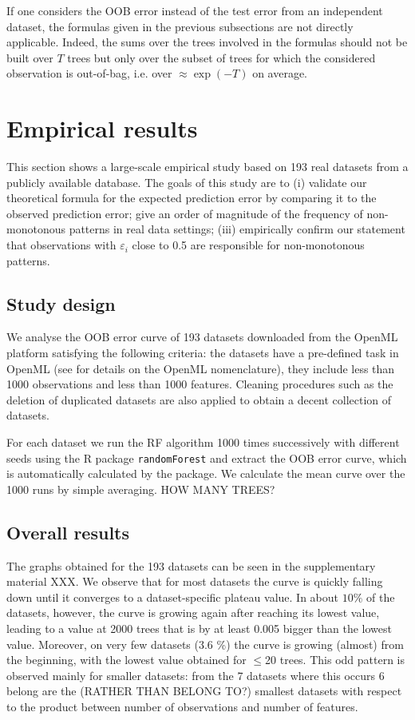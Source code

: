 \documentclass[paper=a4
               ,12pt
               ,DIV=12
               ,parskip=half
               ,titlepage=on
               ,headinclude 
               ,footinclude
               ,headsepline
               ,footsepline         %
               ,ilines 
               ]{scrartcl}
\begin{document}
If one considers the OOB error instead of the test error from an independent dataset, the formulas given in the previous subsections are not directly applicable.
Indeed, the sums over the trees involved in the formulas should not be built over $T$ trees but only over the subset of trees for which the considered observation is out-of-bag, i.e. over $\approx\exp (-T)$ on average.

\section{Empirical results}
\label{sec:empirical}

This section shows a large-scale empirical study based on 193 real datasets from a publicly available database. The goals of this study are to (i) validate our theoretical formula for the expected prediction error by comparing it to the observed prediction error; give an order of magnitude of the frequency of non-monotonous patterns in real data settings; (iii) empirically confirm our statement that observations with $\varepsilon_i$ close to 0.5 are responsible for non-monotonous patterns. 

\subsection{Study design}
We analyse the OOB error curve of 193 datasets downloaded from the OpenML platform \citep{OpenML2013} satisfying the following criteria: the datasets have a pre-defined task in OpenML (see \citet{OpenML2013} for details on the OpenML nomenclature), they include less than 1000 observations and less than 1000 features. Cleaning procedures such as the deletion of duplicated datasets are also applied to obtain a decent collection of datasets. 

For each dataset we run the RF algorithm 1000 times successively with different seeds using the R package \texttt{randomForest} \citep{Liaw2002} and extract the OOB error curve, which is automatically calculated by the package. 
We calculate the mean curve over the 1000 runs by simple averaging. HOW MANY TREES?

\subsection{Overall results}
The graphs obtained for the 193 datasets can be seen in the supplementary material XXX. 
We observe that for most datasets the curve is quickly falling down until it converges to a dataset-specific plateau value. In about $10\%$ of the datasets, however, the curve is growing again after reaching its lowest value, leading to a value at 2000 trees that is by at least 0.005 bigger than the lowest value. Moreover, on very few datasets (3.6 \%) the curve is growing (almost) from the beginning, with the lowest value obtained for $\leq$20 trees. This odd pattern is observed mainly for smaller datasets: from the 7 datasets where this occurs 6 belong are the (RATHER THAN BELONG TO?) smallest datasets with respect to the product between number of observations and number of features. 
\end{document}
